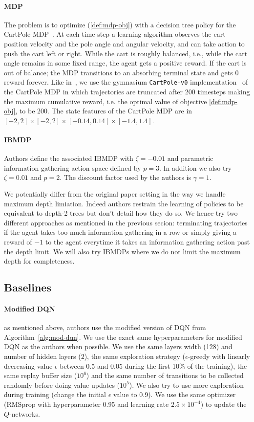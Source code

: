 \paragraph{MDP} The problem is to optimize (\ref{def:mdp-obj}) with a decision tree policy for the CartPole MDP~\cite{cartpole}.
At each time step a learning algorithm observes the cart position velocity and the pole angle and angular velocity, and can take action to push the cart left or right.
While the cart is roughly balanced, i.e., while the cart angle remains in some fixed range, the agent gets a positive reward.
If the cart is out of balance; the MDP transitions to an absorbing terminal state and gets 0 reward forever.
Like in~\cite{topin2021iterative}, we use the gymnasium \texttt{CartPole-v0} implementation~\cite{gymnasium} of the CartPole MDP in which trajectories are truncated after 200 timesteps making the maximum cumulative reward, i.e. the optimal value of objective \ref{def:mdp-obj}, to be 200.
The state features of the CartPole MDP are in $[-2, 2] \times [-2, 2] \times [-0.14, 0.14] \times [-1.4, 1.4]$.

\paragraph{IBMDP} Authors define the associated IBMDP with $\zeta=-0.01$ and parametric information gathering action space defined by $p=3$.
In addition we also try $\zeta=0.01$ and $p=2$.
The discount factor used by the authors is $\gamma=1$.

We potentially differ from the original paper setting in the way we handle maximum depth limiation. 
Indeed authors restrain the learning of policies to be equivalent to depth-2 trees but don't detail how they do so.
We hence try two different approaches as mentioned in the previous secion: terminating trajectories if the agent takes too much information gathering in a row or simply giving a reward of $-1$ to the agent everytime it takes an information gathering action past the depth limit.
We will also try IBMDPs where we do not limit the maximum depth for completeness.

\subsection{Baselines}
\paragraph{Modified DQN} as mentioned above, authors use the modified version of DQN from Algorithm~\ref{alg:mod-dqn}.
We use the exact same hyperparameters for modified DQN as the authors when possible. 
We use the same layers width (128) and number of hidden layers (2), the same exploration strategy ($\epsilon$-greedy with linearly decreasing value $\epsilon$ between 0.5 and 0.05 during the first 10\% of the training),
the same replay buffer size ($10^6$) and the same number of transitions to be collected randomly before doing value updates ($10^5$).
We also try to use more exploration during training (change the initial $\epsilon$ value to 0.9).
We use the same optimizer (RMSprop with hyperparameter 0.95 and learning rate $2.5 \times 10^{-4}$) to update the $Q$-networks.

